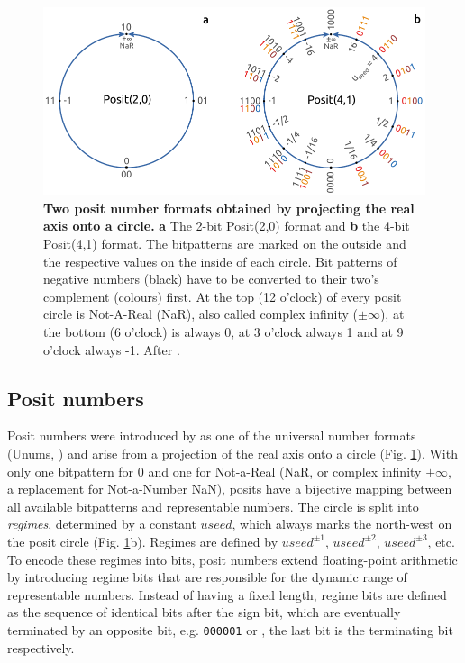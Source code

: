 \begin{figure}[tbhp]
	\includegraphics[width=1\textwidth]{Figures/methods/posit_circles.pdf}
	\caption{\textbf{Two posit number formats obtained by projecting the real axis onto a circle.}
	\textbf{a} The 2-bit Posit(2,0) format and \textbf{b} the 4-bit Posit(4,1) format. The bitpatterns are marked on the outside
	and the respective values on the inside of each circle. Bit patterns of negative numbers (black) have to be converted to their
	two's complement (colours) first. At the top (12 o'clock) of every posit circle is Not-A-Real (NaR), also called complex infinity ($\pm \infty$),
	at the bottom (6 o'clock) is always 0, at 3 o'clock always 1 and at 9 o'clock always -1. After \cite{Gustafson2017a}.}
	\label{fig:posit_circle}
\end{figure}

\subsection{Posit numbers}
\label{sec:posits}

Posit numbers were introduced by \cite{Gustafson2017a} as one of the universal number formats (Unums, \cite{Gustafson2015})
and arise from a projection of the real axis onto a circle (Fig. \ref{fig:posit_circle}).
With only one bitpattern for 0 and one for Not-a-Real (NaR, or complex infinity $\pm \infty$, a replacement for Not-a-Number NaN),
posits have a bijective mapping between all available bitpatterns and representable numbers. The circle is split into
\emph{regimes}, determined by a constant $useed$, which always marks the north-west on the posit circle (Fig. \ref{fig:posit_circle}b).
Regimes are defined by $useed^{\pm1}$, $useed^{\pm2}$, $useed^{\pm3}$, etc. To encode these regimes into bits, posit
numbers extend floating-point arithmetic by introducing regime bits that are responsible for the dynamic range of representable
numbers. Instead of having a fixed length, regime bits are defined as the sequence of identical bits after the sign bit, which are
eventually terminated by an opposite bit, e.g. \texttt{000001} or , the last bit is the terminating bit respectively.

